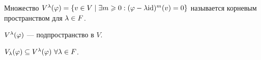 \begin{Def}
Множество $V^\lambda(\varphi) = \{ v \in V \mid \exists m \geqslant 0  : (\varphi - \lambda\mathrm{id})^m(v) = 0 \}$ называется корневым пространством для $\lambda \in F$.
\end{Def}

\begin{Task}
$V^\lambda(\varphi)$ --- подпространство в $V$.
\end{Task}

\begin{Comment}
$V_\lambda(\varphi) \subseteq V^\lambda(\varphi) \ \forall \lambda \in F$.
\end{Comment}



